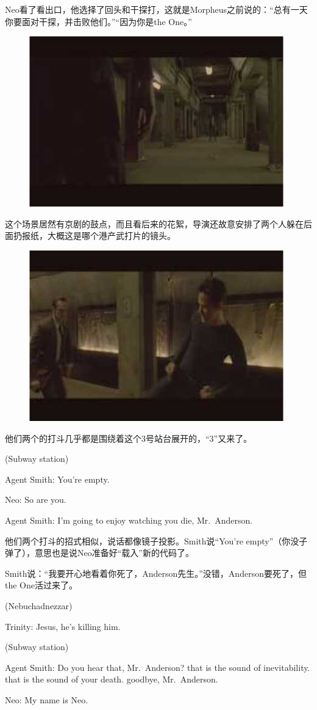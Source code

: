 \documentclass[UTF8]{ctexart}
\newenvironment{myquote}{\color{green} \setlength{\leftskip}{6em} \setlength{\rightskip}{4em} \setlength{\parindent}{-2em}}{\par}
\begin{document}
Neo看了看出口，他选择了回头和干探打，这就是Morpheus之前说的：“总有一天你要面对干探，并击败他们。”“因为你是the One。”

\begin{figure}[htb]
\centering
\includegraphics[width=0.5\linewidth]{fig/read_Matrix-72}
\end{figure}

这个场景居然有京剧的鼓点，而且看后来的花絮，导演还故意安排了两个人躲在后面扔报纸，大概这是哪个港产武打片的镜头。

\begin{figure}[htb]
\centering
\includegraphics[width=0.5\linewidth]{fig/read_Matrix-73}
\end{figure}

他们两个的打斗几乎都是围绕着这个3号站台展开的，“3”又来了。

\begin{myquote}
(Subway station)

Agent Smith: You're empty.

Neo: So are you.

Agent Smith: I'm going to enjoy watching you die, Mr.~Anderson.
\end{myquote}

他们两个打斗的招式相似，说话都像镜子投影。Smith说“You're empty”（你没子弹了），意思也是说Neo准备好“载入”新的代码了。

Smith说：“我要开心地看着你死了，Anderson先生。”没错，Anderson要死了，但the One活过来了。

\begin{myquote}
(Nebuchadnezzar)

Trinity: Jesus, he's killing him.

(Subway station)

Agent Smith: Do you hear that, Mr.~Anderson? that is the sound of inevitability. that is the sound of your death. goodbye, Mr.~Anderson.

Neo: My name is Neo.
\end{myquote}
\end{document}
